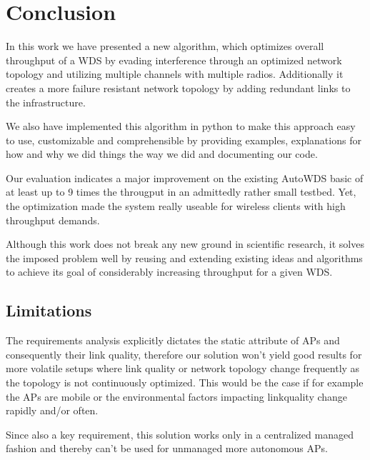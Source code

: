 \chapter{Conclusion}
  In this work we have presented a new algorithm, which optimizes overall throughput of a \ac{WDS} by evading interference through an optimized network topology 
  and utilizing multiple channels with multiple radios. Additionally it creates a more failure resistant network topology by adding redundant links to the infrastructure.
  
  We also have implemented this algorithm in python to make this approach easy to use, customizable and comprehensible by providing examples, 
  explanations for how and why we did things the way we did and documenting our code.
  
  Our evaluation indicates a major improvement on the existing AutoWDS basic of at least up to 9 times the througput in an admittedly rather small testbed.
  Yet, the optimization made the system really useable for wireless clients with high throughput demands.
  
  Although this work does not break any new ground in scientific research, it solves the imposed problem well by reusing and extending existing ideas and algorithms to
  achieve its goal of considerably increasing throughput for a given \ac{WDS}.
  
  \section{Limitations}
    The requirements analysis explicitly dictates the static attribute of APs and consequently their link quality, therefore our solution won't yield good 
    results for more volatile setups where link quality or network topology change frequently as the topology is not continuously optimized. 
    This would be the case if for example the APs are mobile or the environmental factors impacting linkquality change rapidly and/or often.
    
    Since also a key requirement, this solution works only in a centralized managed fashion and thereby can't be used for unmanaged more autonomous APs.
    
